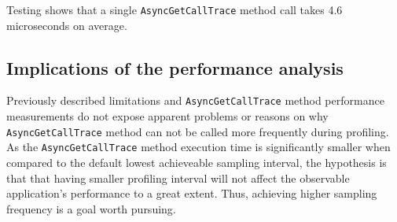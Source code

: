\documentclass[..thesis.tex]{subfiles}
\begin{document}
Testing shows that a single \texttt{AsyncGetCallTrace} method call takes 4.6 microseconds on average.

\subsection{Implications of the performance analysis}
Previously described limitations and \texttt{Async\-Get\-Call\-Trace} method performance measurements do not expose apparent problems or reasons on why \texttt{Async\-Get\-Call\-Trace} method can not be called more frequently during profiling. As the \texttt{Async\-Get\-Call\-Trace} method execution time is significantly smaller when compared to the default lowest achieveable sampling interval, the hypothesis is that that having smaller profiling interval will not affect the observable application's performance to a great extent. Thus, achieving higher sampling frequency is a goal worth pursuing.
\end{document}
